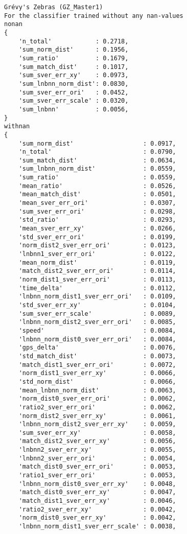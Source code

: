 \begin{verbatim}
Grévy's Zebras (GZ_Master1)
For the classifier trained without any nan-values
nonan
{
    'n_total'            : 0.2718,
    'sum_norm_dist'      : 0.1956,
    'sum_ratio'          : 0.1679,
    'sum_match_dist'     : 0.1017,
    'sum_sver_err_xy'    : 0.0973,
    'sum_lnbnn_norm_dist': 0.0830,
    'sum_sver_err_ori'   : 0.0452,
    'sum_sver_err_scale' : 0.0320,
    'sum_lnbnn'          : 0.0056,
}
withnan
{
    'sum_norm_dist'                   : 0.0917,
    'n_total'                         : 0.0790,
    'sum_match_dist'                  : 0.0634,
    'sum_lnbnn_norm_dist'             : 0.0559,
    'sum_ratio'                       : 0.0559,
    'mean_ratio'                      : 0.0526,
    'mean_match_dist'                 : 0.0501,
    'mean_sver_err_ori'               : 0.0307,
    'sum_sver_err_ori'                : 0.0298,
    'std_ratio'                       : 0.0293,
    'mean_sver_err_xy'                : 0.0266,
    'std_sver_err_ori'                : 0.0199,
    'norm_dist2_sver_err_ori'         : 0.0123,
    'lnbnn1_sver_err_ori'             : 0.0122,
    'mean_norm_dist'                  : 0.0119,
    'match_dist2_sver_err_ori'        : 0.0114,
    'norm_dist1_sver_err_ori'         : 0.0113,
    'time_delta'                      : 0.0112,
    'lnbnn_norm_dist1_sver_err_ori'   : 0.0109,
    'std_sver_err_xy'                 : 0.0104,
    'sum_sver_err_scale'              : 0.0089,
    'lnbnn_norm_dist2_sver_err_ori'   : 0.0085,
    'speed'                           : 0.0084,
    'lnbnn_norm_dist0_sver_err_ori'   : 0.0084,
    'gps_delta'                       : 0.0076,
    'std_match_dist'                  : 0.0073,
    'match_dist1_sver_err_ori'        : 0.0072,
    'norm_dist1_sver_err_xy'          : 0.0066,
    'std_norm_dist'                   : 0.0066,
    'mean_lnbnn_norm_dist'            : 0.0063,
    'norm_dist0_sver_err_ori'         : 0.0062,
    'ratio2_sver_err_ori'             : 0.0062,
    'norm_dist2_sver_err_xy'          : 0.0061,
    'lnbnn_norm_dist2_sver_err_xy'    : 0.0059,
    'sum_sver_err_xy'                 : 0.0058,
    'match_dist2_sver_err_xy'         : 0.0056,
    'lnbnn2_sver_err_xy'              : 0.0055,
    'lnbnn2_sver_err_ori'             : 0.0054,
    'match_dist0_sver_err_ori'        : 0.0053,
    'ratio1_sver_err_ori'             : 0.0053,
    'lnbnn_norm_dist0_sver_err_xy'    : 0.0048,
    'match_dist0_sver_err_xy'         : 0.0047,
    'match_dist1_sver_err_xy'         : 0.0046,
    'ratio2_sver_err_xy'              : 0.0042,
    'norm_dist0_sver_err_xy'          : 0.0042,
    'lnbnn_norm_dist1_sver_err_scale' : 0.0038,

\end{verbatim}
